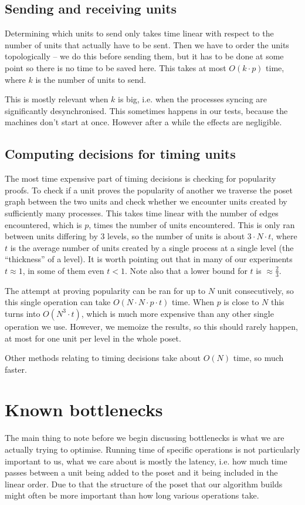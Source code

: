 \documentclass[a4paper,10pt]{article}
\begin{document}
		\subsection{Sending and receiving units}
		 Determining which units to send only takes time linear with respect to the number of units that actually have to be sent.
			Then we have to order the units topologically -- we do this before sending them, but it has to be done at some point so there is no time to be saved here.
			This takes at most $O(k \cdot p)$ time, where $k$ is the number of units to send.

			This is mostly relevant when $k$ is big, i.e. when the processes syncing are significantly desynchronised.
			This sometimes happens in our tests, because the machines don't start at once.
			However after a while the effects are negligible.
		\subsection{Computing decisions for timing units}
		 The most time expensive part of timing decisions is checking for popularity proofs.
			To check if a unit proves the popularity of another we traverse the poset graph between the two units and check whether
			we encounter units created by sufficiently many processes. This takes time linear with the number of edges encountered,
			which is $p$, times the number of units encountered. This is only ran between units differing by $3$ levels, so the number of units
			is about $3 \cdot N \cdot t$, where $t$ is the average number of units created by a single process at a single level (the ``thickness'' of a level).
			It is worth pointing out that in many of our experiments $t \approx 1$, in some of them even $t<1$. Note also that a lower bound for $t$ is $\approx \frac{2}{3}$.

			The attempt at proving popularity can be ran for up to $N$ unit consecutively, so this single operation can take $O(N \cdot N \cdot p \cdot t)$ time.
			When $p$ is close to $N$ this turns into $O(N^3 \cdot t)$, which is much more expensive than any other single operation we use.
			However, we memoize the results, so this should rarely happen, at most for one unit per level in the whole poset.

			Other methods relating to timing decisions take about $O(N)$ time, so much faster.
	\section{Known bottlenecks}
		The main thing to note before we begin discussing bottlenecks is what we are actually trying to optimise.
		Running time of specific operations is not particularly important to us, what we care about is mostly the latency,
		i.e. how much time passes between a unit being added to the poset and it being included in the linear order.
		Due to that the structure of the poset that our algorithm builds might often be more important than how long various operations take.
\end{document}
